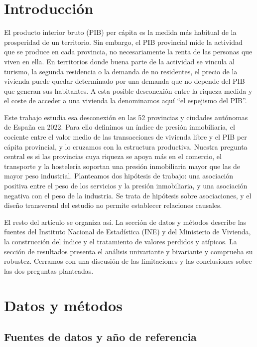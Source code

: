 \documentclass[econometrics,article,submit,moreauthors,pdftex]{Definitions/mdpi}
\begin{document}

\section{Introducción}\label{introducciuxf3n}

El producto interior bruto (PIB) per cápita es la medida más habitual de
la prosperidad de un territorio. Sin embargo, el PIB provincial mide la
actividad que se produce en cada provincia, no necesariamente la renta
de las personas que viven en ella. En territorios donde buena parte de
la actividad se vincula al turismo, la segunda residencia o la demanda
de no residentes, el precio de la vivienda puede quedar determinado por
una demanda que no depende del PIB que generan sus habitantes. A esta
posible desconexión entre la riqueza medida y el coste de acceder a una
vivienda la denominamos aquí ``el espejismo del PIB''.

Este trabajo estudia esa desconexión en las 52 provincias y ciudades
autónomas de España en 2022. Para ello definimos un índice de presión
inmobiliaria, el cociente entre el valor medio de las transacciones de
vivienda libre y el PIB per cápita provincial, y lo cruzamos con la
estructura productiva. Nuestra pregunta central es si las provincias
cuya riqueza se apoya más en el comercio, el transporte y la hostelería
soportan una presión inmobiliaria mayor que las de mayor peso
industrial. Planteamos dos hipótesis de trabajo: una asociación positiva
entre el peso de los servicios y la presión inmobiliaria, y una
asociación negativa con el peso de la industria. Se trata de hipótesis
sobre asociaciones, y el diseño transversal del estudio no permite
establecer relaciones causales.

El resto del artículo se organiza así. La sección de datos y métodos
describe las fuentes del Instituto Nacional de Estadística (INE) y del
Ministerio de Vivienda, la construcción del índice y el tratamiento de
valores perdidos y atípicos. La sección de resultados presenta el
análisis univariante y bivariante y comprueba su robustez. Cerramos con
una discusión de las limitaciones y las conclusiones sobre las dos
preguntas planteadas.

\section{Datos y métodos}\label{datos-y-muxe9todos}

\subsection{Fuentes de datos y año de
referencia}\label{fuentes-de-datos-y-auxf1o-de-referencia}
\end{document}
